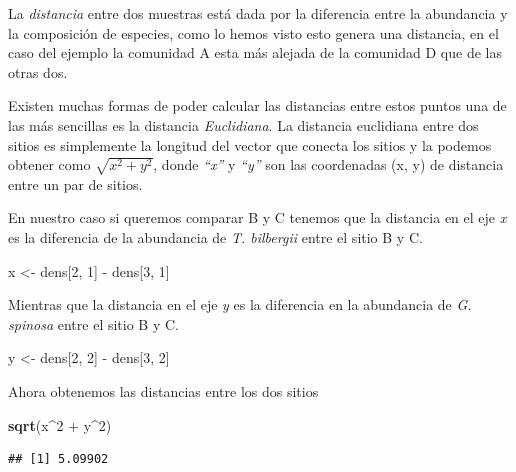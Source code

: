 \documentclass[]{book}
\newenvironment{Shaded}{\begin{snugshade}}{\end{snugshade}}
\newcommand{\KeywordTok}[1]{\textcolor[rgb]{0.13,0.29,0.53}{\textbf{{#1}}}}
\newcommand{\DecValTok}[1]{\textcolor[rgb]{0.00,0.00,0.81}{{#1}}}
\newcommand{\StringTok}[1]{\textcolor[rgb]{0.31,0.60,0.02}{{#1}}}
\newcommand{\NormalTok}[1]{{#1}}
\begin{document}
La \emph{distancia} entre dos muestras está dada por la diferencia entre
la abundancia y la composición de especies, como lo hemos visto esto
genera una distancia, en el caso del ejemplo la comunidad A esta más
alejada de la comunidad D que de las otras dos.

Existen muchas formas de poder calcular las distancias entre estos
puntos una de las más sencillas es la distancia \emph{Euclidiana}. La
distancia euclidiana entre dos sitios es simplemente la longitud del
vector que conecta los sitios y la podemos obtener como
\(\sqrt{x^2+y^2}\), donde \emph{``x''} y \emph{``y''} son las
coordenadas (x, y) de distancia entre un par de sitios.

En nuestro caso si queremos comparar B y C tenemos que la distancia en
el eje \emph{x} es la diferencia de la abundancia de \emph{T. bilbergii}
entre el sitio B y C.

\begin{Shaded}
\begin{Highlighting}[]
\NormalTok{x <-}\StringTok{ }\NormalTok{dens[}\DecValTok{2}\NormalTok{, }\DecValTok{1}\NormalTok{] -}\StringTok{ }\NormalTok{dens[}\DecValTok{3}\NormalTok{, }\DecValTok{1}\NormalTok{]}
\end{Highlighting}
\end{Shaded}

Mientras que la distancia en el eje \emph{y} es la diferencia en la
abundancia de \emph{G. spinosa} entre el sitio B y C.

\begin{Shaded}
\begin{Highlighting}[]
\NormalTok{y <-}\StringTok{ }\NormalTok{dens[}\DecValTok{2}\NormalTok{, }\DecValTok{2}\NormalTok{] -}\StringTok{ }\NormalTok{dens[}\DecValTok{3}\NormalTok{, }\DecValTok{2}\NormalTok{]}
\end{Highlighting}
\end{Shaded}

Ahora obtenemos las distancias entre los dos sitios

\begin{Shaded}
\begin{Highlighting}[]
\KeywordTok{sqrt}\NormalTok{(x^}\DecValTok{2} \NormalTok{+}\StringTok{ }\NormalTok{y^}\DecValTok{2}\NormalTok{)}
\end{Highlighting}
\end{Shaded}

\begin{verbatim}
## [1] 5.09902
\end{verbatim}
\end{document}
